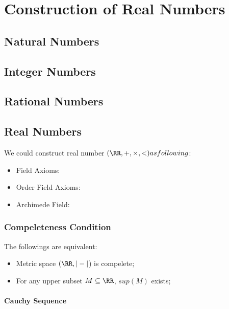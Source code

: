 \documentclass[Total.tex]{subfiles}
\begin{document}
	\chapter{Construction of Real Numbers}
		\section{Natural Numbers}
		\section{Integer Numbers}
		\section{Rational Numbers}
		\section{Real Numbers}
			\begin{axiom}
				We could construct real number $(\RR,+,\times,<) as following$:
				
				\begin{itemize}
					\item Field Axioms:
					\item Order Field Axioms:
					\item Archimede Field: 
				\end{itemize}
			\end{axiom}
			\subsection{Compeleteness Condition}
				
				\begin{proposition}
					The followings are equivalent:
					\begin{itemize}
						\item Metric space $(\RR,|-|$) is compelete;
						\item For any upper subset $M\subseteq \RR$, $sup(M)$ exists;
					\end{itemize}
				\end{proposition}
				
				\subsubsection{Cauchy Sequence}
				
\end{document}
